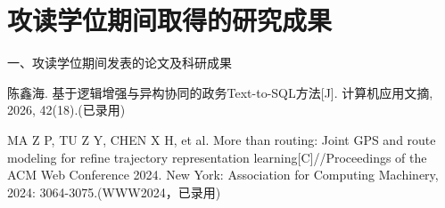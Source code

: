 \chapter*{攻读\cDegree{}学位期间取得的研究成果}



一、攻读\cDegree{}学位期间发表的论文及科研成果
\begin{publist}
	\item
	    陈鑫海. 基于逻辑增强与异构协同的政务Text-to-SQL方法[J]. 计算机应用文摘, 2026, 42(18).(已录用)
	\item 
	    MA Z P, TU Z Y, CHEN X H, et al. More than routing: Joint GPS and route modeling for refine trajectory representation learning[C]//Proceedings of the ACM Web Conference 2024. New York: Association for Computing Machinery, 2024: 3064-3075.(WWW2024，已录用)
\end{publist}

	
